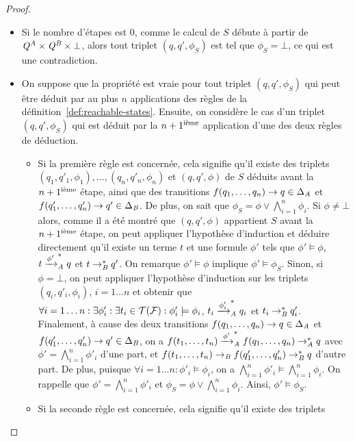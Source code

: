 \begin{proof}
\begin{itemize}
\item Si le nombre d'étapes est $0$, comme le calcul de $S$ débute
  à partir de $\Q^\A \times \Q^\B \times \bot$, alors tout triplet $(q,q',\phi_S)$
  est tel que $\phi_S=\bot$, ce qui est une contradiction.

\item On suppose que la propriété est vraie pour tout triplet $(q,q',\phi_S)$ qui peut être
  déduit par au plus $n$ applications des règles de la définition~\ref{def:reachable-states}.
  Ensuite, on considère le cas d'un triplet $(q,q',\phi_S)$ qui est déduit 
  par la $n+1^\iem$ application d'une des deux règles de déduction.
  \begin{itemize}
  \item Si la première règle est concernée, cela signifie qu'il existe
    des triplets  $(q_1,q'_1, \phi_1),\ldots,(q_n,q'_n,\phi_n)$ et $(q,q',\phi)$ de $S$
    déduits avant la $n+1^\iem$ étape, ainsi que des transitions $f(q_1,\ldots,q_n)\rw q
    \in \Delta_\A$ et $f(q'_1,\ldots,q'_n)\rw q' \in \Delta_\B$. De plus,
    on sait que $\phi_S=\phi \vee \bigwedge_{i=1}^n \phi_i$.
    Si $\phi\neq \bot$ alors, comme il a été montré que $(q,q',\phi)$ appartient $S$
    avant la $n+1^\iem$ étape, on peut appliquer l'hypothèse d'induction et déduire directement
    qu'il existe un terme $t$ et une formule $\phi'$ tels que $\phi'
    \models \phi$, $t \xrw{\phi'}^*_\A q$ et $t \rwB^* q'$. On remarque $\phi'
    \models \phi$ implique $\phi' \models \phi_S$.
    Sinon, si $\phi=\bot$, %
    on peut appliquer l'hypothèse d'induction sur les triplets $(q_i,q'_i,\phi_i)$,
    $i=1\ldots n$ et obtenir que $\forall i=1\ldots n:\exists \phi_i':\exists
    t_i \in\TF: \phi'_i \models \phi_i$, $t_i \xrw{\phi_i'}_\A^* q_i$ et $t_i
    \rwB^* q'_i$. Finalement, 
    à cause des deux transitions $f(q_1,\ldots,q_n)\rw q \in \Delta_\A$ et
    $f(q'_1,\ldots,q'_n)\rw q' \in \Delta_\B$, on a $f(t_1,\ldots,t_n)
    \xrw{\phi'}_\A^* f(q_1,\ldots,q_n) \rwA^* q$ avec
    $\phi'=\bigwedge_{i=1}^n \phi'_i$ d'une part, et $f(t_1,\ldots,t_n) 
    \rwB f(q'_1,\ldots,q'_n) \rwB^* q$ d'autre part. De plus,
    puisque $\forall i=1\ldots n: \phi'_i \models \phi_i$, on a 
    $\bigwedge_{i=1}^n \phi'_i \models \bigwedge_{i=1}^n \phi_i$. On rappelle que
    $\phi'= \bigwedge_{i=1}^n \phi'_i$ et $\phi_S= \phi\vee \bigwedge_{i=1}^n
    \phi_i$. Ainsi, $\phi' \models \phi_S$.
  \item Si la seconde règle est concernée, cela signifie qu'il existe des triplets

\end{itemize}
\end{itemize}
\end{proof}
